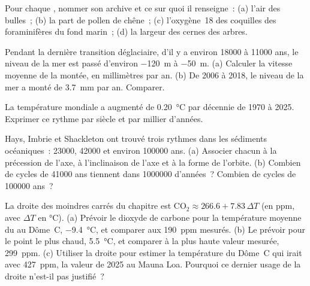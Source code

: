 \begin{exercise}[$\star$]\label{exo:g12:past-climates:2}
Pour chaque , nommer son archive et ce sur quoi il renseigne~:
(a) l'air des bulles~; (b) la part de pollen de chêne~; (c) l'oxygène~18
des coquilles des foraminifères du fond marin~; (d) la largeur des cernes
des arbres.
\end{exercise}

\begin{exercise}[$\star$]\label{exo:g12:past-climates:3}
Pendant la dernière transition déglaciaire, d'il y a environ \num{18000} à
\num{11000} ans, le niveau de la mer est passé d'environ \qty{-120}{m} à
\qty{-50}{m}. (a) Calculer la vitesse moyenne de la montée, en
millimètres par an. (b) De 2006 à 2018, le niveau de la mer a monté de
\qty{3.7}{mm} par an. Comparer.
\end{exercise}

\begin{exercise}[$\star$]\label{exo:g12:past-climates:4}
La température mondiale a augmenté de \qty{0.20}{\degreeCelsius} par
décennie de 1970 à 2025. Exprimer ce rythme par siècle et par millier
d'années.
\end{exercise}

\begin{exercise}[$\star$]\label{exo:g12:past-climates:5}
Hays, Imbrie et Shackleton ont trouvé trois rythmes dans les sédiments
océaniques~: \num{23000}, \num{42000} et environ \num{100000} ans.
(a) Associer chacun à la précession de l'axe, à l'inclinaison de l'axe et
à la forme de l'orbite. (b) Combien de cycles de \num{41000} ans tiennent
dans \num{1000000} d'années~? Combien de cycles de \num{100000} ans~?
\end{exercise}

\begin{exercise}[$\star\star$]\label{exo:g12:past-climates:6}
La droite des moindres carrés du chapitre est $\mathrm{CO_2} \approx 266.6 +
7.83\,\Delta T$ (en ppm, avec $\Delta T$ en \unit{\degreeCelsius}).
(a) Prévoir le dioxyde de carbone pour la température moyenne du  au Dôme~C, \qty{-9.4}{\degreeCelsius}, et comparer aux
\qty{190}{ppm} mesurés. (b) Le prévoir pour le point le plus chaud,
\qty{+5.5}{\degreeCelsius}, et comparer à la plus haute valeur mesurée,
\qty{299}{ppm}. (c) Utiliser la droite pour estimer la température du
Dôme~C qui irait avec \qty{427}{ppm}, la valeur de 2025 au Mauna Loa.
Pourquoi ce dernier usage de la droite n'est-il pas justifié~?
\end{exercise}

